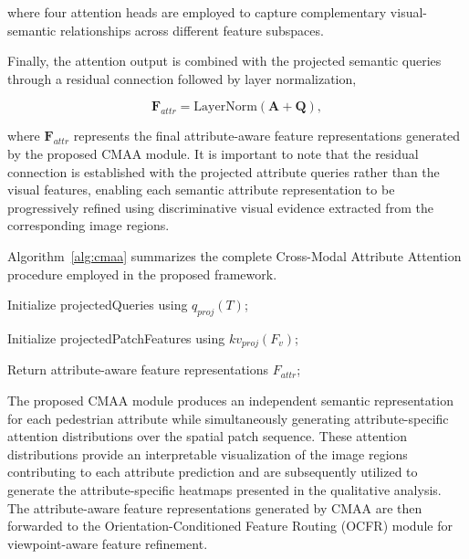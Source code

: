 \documentclass{ieeeaccess}
\begin{document}
where four attention heads are employed to capture complementary visual-semantic relationships across different feature subspaces.

Finally, the attention output is combined with the projected semantic queries through a residual connection followed by layer normalization,

\begin{equation}
\mathbf{F}_{attr}
=
\mathrm{LayerNorm}
(\mathbf{A}+\mathbf{Q}),
\label{eq:cmaa_output}
\end{equation}

where $\mathbf{F}_{attr}$ represents the final attribute-aware feature representations generated by the proposed CMAA module. It is important to note that the residual connection is established with the projected attribute queries rather than the visual features, enabling each semantic attribute representation to be progressively refined using discriminative visual evidence extracted from the corresponding image regions.

Algorithm~\ref{alg:cmaa} summarizes the complete Cross-Modal Attribute Attention procedure employed in the proposed framework.
\begin{algorithm}[H]
\caption{Cross-Modal Attribute Attention (CMAA)}
\label{alg:cmaa}

Initialize projectedQueries using $q_{proj}(T)$;

Initialize projectedPatchFeatures using $kv_{proj}(F_v)$;


Return attribute-aware feature representations $F_{attr}$;

\end{algorithm}

The proposed CMAA module produces an independent semantic representation for each pedestrian attribute while simultaneously generating attribute-specific attention distributions over the spatial patch sequence. These attention distributions provide an interpretable visualization of the image regions contributing to each attribute prediction and are subsequently utilized to generate the attribute-specific heatmaps presented in the qualitative analysis. The attribute-aware feature representations generated by CMAA are then forwarded to the Orientation-Conditioned Feature Routing (OCFR) module for viewpoint-aware feature refinement.
\end{document}
